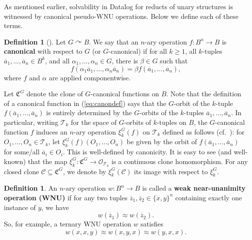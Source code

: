 \documentclass{article}
\theoremstyle{remark}
\theoremstyle{definition}
\newtheorem{definition}[theorem]{Definition}
\def\acts{\curvearrowright}
\begin{document}
As mentioned earlier, solvability in Datalog for reducts of unary structures is witnessed by canonical pseudo-WNU operations. Below we define each of these terms.

\begin{definition}[{\cite{pinsker2021canonical}}] Let $G\acts B$. We say that an $n$-ary operation $f:B^n\to B$ is \textbf{canonical} with respect to $G$ (or $G$-canonical) if for all $k\geq 1$, all $k$-tuples $\overline{a}_1, \dots, \overline{a}_n\in B^k$, and all $\alpha_1, \dots, \alpha_n\in G$, there is $\beta\in G$ such that
\begin{equation}\label{eq:canondef}
    f(\alpha_1 \overline{a}_1, \dots, \alpha_n \overline{a}_n)=\beta f(\overline{a}_1, \dots, \overline{a}_n),
\end{equation}
where $f$ and $\alpha$ are applied componentwise. 

Let $\mathfrak{C}^G$ denote the clone of $G$-canonical functions on $B$. Note that the definition of a canonical function in (\ref{eq:canondef}) says that the $G$-orbit of the $k$-tuple $f(\overline{a}_1, \dots, \overline{a}_n)$ is entirely determined by the $G$-orbits of the $k$-tuples $\overline{a}_1, \dots, \overline{a}_n$. In particular, writing $\mathcal{T}_k$ for the space of $G$-orbits of $k$-tuples on $B$, the $G$-canonical function $f$ induces an $n$-ary operation $\xi_k^G(f)$ on $\mathcal{T}_k$ defined as follows (cf.~\cite{BPP-projective-homomorphisms}): for $O_1, \dots, O_n\in\mathcal{T}_k$, let $\xi_k^G(f)(O_1, \dots, O_n)$ be given by the orbit of $f(\overline{a}_1, \dots, \overline{a}_n)$ for some/all $\overline{a}_i\in O_i$. This is well-defined by canonicity. It is easy to see (and well-known) that the map $\xi_k^G:\mathfrak{C}^G\to \mathcal{O}_{\mathcal{T}_k}$ is a continuous clone homomorphism.  For any closed clone $\mathcal{C}\subseteq \mathfrak{C}^G$, we denote by $\xi_k^G(\mathcal{C})$ its image with respect to $\xi_k^G$.
\end{definition}

\begin{definition}\label{def:WNU} An $n$-ary operation $w:B^n\to B$ is called a \textbf{weak near-unanimity operation (WNU)} if for any two tuples $\overline{z}_1, \overline{z}_2\in\{x,y\}^n$ containing exactly one instance of $y$, we have
\[w(\overline{z}_1)\approx w(\overline{z}_2).\]
So, for example, a ternary WNU operation $w$ satisfies 
\[w(x,x,y)\approx w(x,y,x)\approx w(y,x,x).\]
\end{definition}
\end{document}
